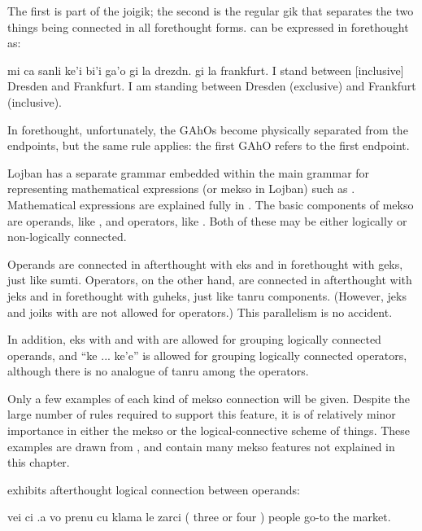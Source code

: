 The first  is part of the joigik; the second  is
    the regular gik that separates the two things being connected
    in all forethought forms.
 can be expressed in
    forethought as:
\begin{example}
mi ca sanli ke'i bi'i ga'o\n
\T	gi la drezdn.\n
\T	gi la frankfurt.\n
I  stand\n
\T	[exclusive] between [inclusive] Dresden\n
\T	and Frankfurt.\n
I am standing between Dresden (exclusive)\n
\T	and Frankfurt (inclusive).
\end{example}

In forethought, unfortunately, the GAhOs become physically
    separated from the endpoints, but the same rule applies: the
    first GAhO refers to the first endpoint.



Lojban has a separate grammar embedded within the main
    grammar for representing mathematical expressions (or mekso in
    Lojban) such as . Mathematical expressions are
    explained fully in . The
    basic components of mekso are operands, like , and
    operators, like \q{+}. Both of these may be either logically or
    non-logically connected.

Operands are connected in afterthought with eks and in
    forethought with geks, just like sumti. Operators, on the other
    hand, are connected in afterthought with jeks and in
    forethought with guheks, just like tanru components. (However,
    jeks and joiks with  are not allowed for operators.) This
    parallelism is no accident.

In addition, eks with  and with  are
    allowed for grouping logically connected operands, and ``ke ...
    ke'e'' is allowed for grouping logically connected operators,
    although there is no analogue of tanru among the operators.

Only a few examples of each kind of mekso connection will be
    given. Despite the large number of rules required to support
    this feature, it is of relatively minor importance in either
    the mekso or the logical-connective scheme of things. These
    examples are drawn from ,
    and contain many mekso features not explained in this
    chapter.

 exhibits afterthought
    logical connection between operands:
\begin{example}
vei ci .a vo  prenu cu klama le zarci\n
( three or four ) people go-to the market.
\end{example}

